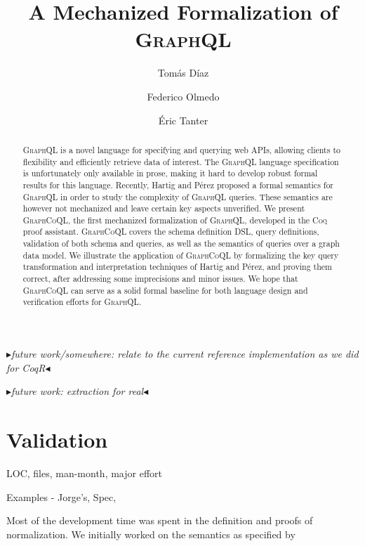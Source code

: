 \documentclass[sigplan,10pt,anonymous,review,nonacm]{acmart}
\newcommand{\mynote}[3]
    {{\color{#3} \fbox{\bfseries\sffamily\scriptsize#1}
    {\small$\blacktriangleright$\textsf{\emph{#2}}$\blacktriangleleft$}}~}
\newcommand{\et}[1]{\mynote{ET}{#1}{purple}}
\newcommand{\plstyle}[1]{\mbox{\textsc{#1}}\xspace}
\newcommand{\gql}{\plstyle{GraphQL}}
\newcommand{\gcoql}{\plstyle{GraphCoQL}}
\newcommand{\coq}{\plstyle{Coq}}
\begin{document}
\title{A Mechanized Formalization of \gql}
\author{Tomás Díaz}

\author{Federico Olmedo}
\author{Éric Tanter}

\begin{abstract}
\gql is a novel language for specifying and querying web APIs, allowing clients to flexibility and efficiently retrieve data of interest. The \gql language specification is unfortunately only available in prose, making it hard to develop robust formal results for this language. Recently, Hartig and Pérez proposed a formal semantics for \gql in order to study the complexity of \gql queries. These semantics are however not mechanized and leave certain key aspects unverified. We present \gcoql, the first mechanized formalization of \gql, developed in the \coq proof assistant.  \gcoql covers the schema definition DSL, query definitions, validation of both schema and queries, as well as the semantics of queries over a graph data model.
We illustrate the application of \gcoql by formalizing the key query transformation and interpretation techniques of Hartig and Pérez, and proving them correct, after addressing some imprecisions and minor issues. 
We hope that \gcoql can serve as a solid formal baseline for both language design and verification efforts for \gql.
\end{abstract}


\maketitle


\et{future work/somewhere: relate to the current reference implementation as we did for CoqR}

\et{future work: extraction for real}








\section{Validation}\label{sec:valid}
LOC, files, man-month, major effort

Examples - Jorge's, Spec,

Most of the development time was spent in the definition and proofs of normalization.
We initially worked on the semantics as specified by \cite{gqlph}







\end{document}
